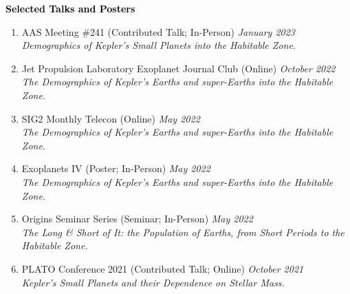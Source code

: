 \documentclass{resume} %
\newcommand{\mystrut}{\rule[-.3\baselineskip]{0pt}{\baselineskip}}
\renewenvironment{rSection}[1]{\mystrut{\textcolor{black}{{\large{\textbf{#1}}}}}
\vspace{-5pt} %
\begin{list}{}{
\setlength{\leftmargin}{0em}
}
\item[]
}{
\end{list}
}
\begin{document}
\newpage
\begin{rSection}{Selected Talks and Posters} \itemsep -2pt
\begin{enumerate}


\item{AAS Meeting \#241 (Contributed Talk; In-Person)} \hfill {\em January 2023} \\
\textit{Demographics of Kepler's Small Planets into the Habitable Zone.}

\item{Jet Propulsion Laboratory Exoplanet Journal Club (Online)} \hfill {\em October 2022} \\
\textit{The Demographics of Kepler's Earths and super-Earths into the Habitable Zone.}

\item{SIG2 Monthly Telecon (Online)} \hfill {\em May 2022} \\
\textit{The Demographics of Kepler's Earths and super-Earths into the Habitable Zone.}

\item{Exoplanets IV (Poster; In-Person)} \hfill {\em May 2022} \\
\textit{The Demographics of Kepler's Earths and super-Earths into the Habitable Zone.}

\item{Origins Seminar Series (Seminar; In-Person)} \hfill {\em May 2022} \\
\textit{The Long \& Short of It: the Population of Earths, from Short Periods to the Habitable Zone.}


\item{PLATO Conference 2021 (Contributed Talk; Online)} \hfill {\em October 2021} \\
\textit{Kepler’s Small Planets and their Dependence on Stellar Mass.}


\end{enumerate}
\end{rSection}
\end{document}
